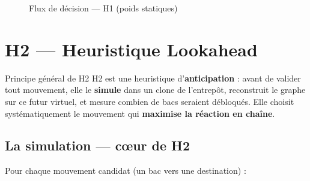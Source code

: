 \documentclass[12pt,a4paper]{article}
\begin{document}
\begin{figure}[H]
{}
\caption{Flux de décision — H1 (poids statiques)}
\end{figure}

\section{H2 — Heuristique Lookahead}

\begin{boxH2}{Principe général de H2}
H2 est une heuristique d'\textbf{anticipation} : avant de valider
tout mouvement, elle le \textbf{simule} dans un clone de l'entrepôt,
reconstruit le graphe sur ce futur virtuel, et mesure combien de bacs
seraient débloqués. Elle choisit systématiquement le mouvement qui
\textbf{maximise la réaction en chaîne}.
\end{boxH2}

\subsection{La simulation — cœur de H2}

Pour chaque mouvement candidat (un bac vers une destination) :
\end{document}
